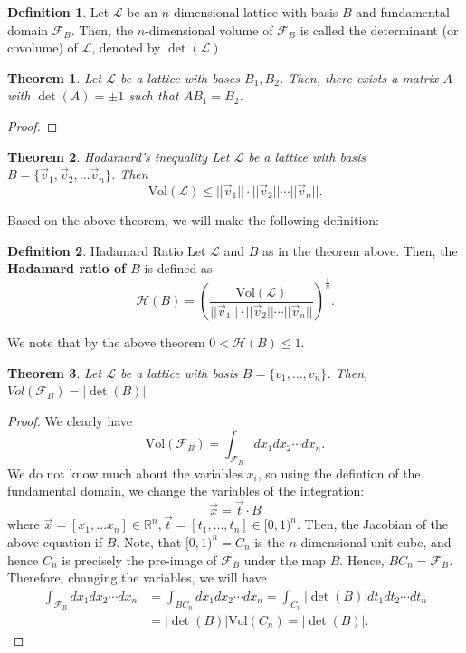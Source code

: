 \documentclass{article}
\newtheorem{theorem}{Theorem}[section]
\theoremstyle{definition}
\newtheorem{definition}{Definition}[section]
\newcommand{\Vol}{\text{Vol}}
\renewcommand{\L}{\mathcal{L}}
\newcommand{\F}{\mathcal{F}}
\newcommand{\Reals}{\mathbb{R}}
\renewcommand{\H}{\mathcal{H}}
\newcommand{\norm}[1]{||#1||}
\begin{document}
\begin{definition}
  Let $\L$ be an $n$-dimensional lattice with basis $B$ and fundamental domain
  $\F_B$. Then, the $n$-dimensional volume of $\F_B$ is called the determinant
  (or covolume) of $\L$, denoted by $\det(\L)$.
\end{definition}
\begin{theorem}
  \label{thm:lattice_change_of_basis}
  Let $\L$ be a lattice with bases $B_1, B_2$. Then, there exists a matrix $A$
  with $\det(A) = \pm 1$ such that $AB_1 = B_2$.
\end{theorem}
\begin{proof}
\end{proof}
\begin{theorem}{Hadamard's inequality}
  Let $\L$ be a lattice with basis $B = \{\vec{v}_1, \vec{v}_2, \hdots \vec{v}_n\}$. Then
\[
  \Vol(\L) \leq \norm{\vec{v}_1}\cdot\norm{\vec{v}_2}\cdots\norm{\vec{v}_n}.
\]
\end{theorem}
Based on the above theorem, we will make the following definition:
\begin{definition}{Hadamard Ratio}
  Let $\L$ and $B$ as in the theorem above. Then, the \textbf{Hadamard ratio of $B$}
  is defined as
  \[
    \H(B) = \left( \frac{\Vol(\L)}{\norm{\vec{v}_1}\cdot\norm{\vec{v}_2}\cdots\norm{\vec{v}_n}} \right)^{\frac1n}.
  \]
\end{definition}
We note that by the above theorem $0 < \H(B) \leq 1$.
\begin{theorem}
  Let $\L$ be a lattice with basis $B = \{v_1, \hdots, v_n\}$. Then, $Vol(\F_B) = |\det(B)|$
\end{theorem}
\begin{proof}
  We clearly have
  \[
    \Vol(\F_B) = \int_{\F_B} dx_1dx_2\cdots dx_n.
  \]
  We do not know much about the variables $x_i$, so using the defintion of the
  fundamental domain, we change the variables of the integration:
  \[
    \vec{x} = \vec{t} \cdot B
  \]
  where $\vec{x} = [x_1, \hdots x_n] \in \Reals^n, \vec{t} = [t_1, \hdots, t_n] \in
  [0, 1)^n$. Then, the Jacobian of the above equation if $B$.
  Note, that $[0, 1)^n = C_n$ is the $n$-dimensional unit cube, and
  hence $C_n$ is precisely the pre-image of $\F_B$ under the map $B$. Hence, $BC_n = \F_B$.
  Therefore, changing the variables, we will have
  \begin{align*}
    \int_{\F_B} dx_1dx_2\cdots dx_n &= \int_{BC_n} dx_1dx_2\cdots dx_n =
                                      \int_{C_n} |\det(B)|dt_1dt_2\cdots dt_n \\
                                    &= |\det(B)|\Vol(C_n) = |\det(B)|.
  \end{align*}
\end{proof}
\end{document}
